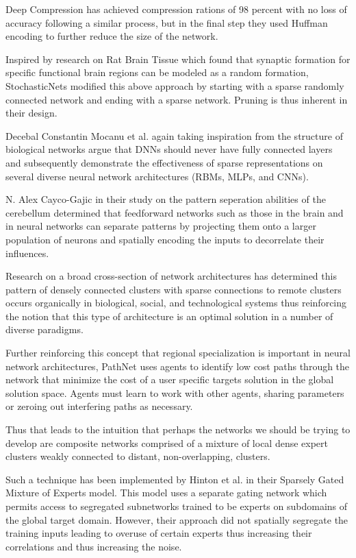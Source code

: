\documentclass{llncs}
\begin{document}
Deep Compression has achieved compression rations of 98 percent with no loss of accuracy following a similar process, but in the final step they used Huffman encoding to further reduce the size of the network.

Inspired by research on Rat Brain Tissue which found that synaptic formation for specific functional brain regions can be modeled as a random formation, StochasticNets modified this above approach by starting with a sparse randomly connected network and ending with a sparse network. Pruning is thus inherent in their design.

Decebal Constantin Mocanu et al. again taking inspiration from the structure of biological networks argue that DNNs should never have fully connected layers and subsequently demonstrate the effectiveness of sparse representations on several diverse neural network architectures (RBMs, MLPs, and CNNs).

N. Alex Cayco-Gajic in their study on the pattern seperation abilities of the cerebellum determined that feedforward networks such as those in the brain and in neural networks can separate patterns by projecting them onto a larger population of neurons and spatially encoding the inputs to decorrelate their influences.

Research on a broad cross-section of network architectures has determined this pattern of densely connected clusters with sparse connections to remote clusters occurs organically in biological, social, and technological systems thus reinforcing the notion that this type of architecture is an optimal solution in a number of diverse paradigms.

Further reinforcing this concept that regional specialization is important in neural network architectures, PathNet uses agents to identify low cost paths through the network that minimize the cost of a user specific targets solution in the global solution space. Agents must learn to work with other agents, sharing parameters or zeroing out interfering paths as necessary.

Thus that leads to the intuition that perhaps the networks we should be trying to develop are composite networks comprised of a mixture of local dense expert clusters weakly connected to distant, non-overlapping, clusters.

Such a technique has been implemented by Hinton et al. in their Sparsely Gated Mixture of Experts model.  This model uses a separate gating network which permits access to segregated subnetworks trained to be experts on subdomains of the global target domain.  However, their approach did not spatially segregate the training inputs leading to overuse of certain experts thus increasing their correlations and thus increasing the noise.
\end{document}
